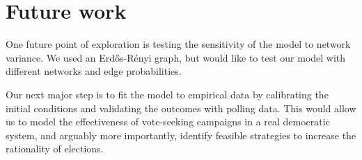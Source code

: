 \section{Future work}
\label{sec:future}








One future point of exploration is testing the sensitivity of the model to network
variance. We used an  Erd\H{o}s-R\'{e}nyi graph,
but would like to test our model with different networks and edge probabilities.

Our next major step is to fit the model to empirical data by calibrating the
initial conditions and validating the outcomes with polling data. This would allow
us to model the effectiveness of vote-seeking campaigns in a real democratic
system, and arguably more importantly, identify feasible strategies to increase the 
rationality of elections.

